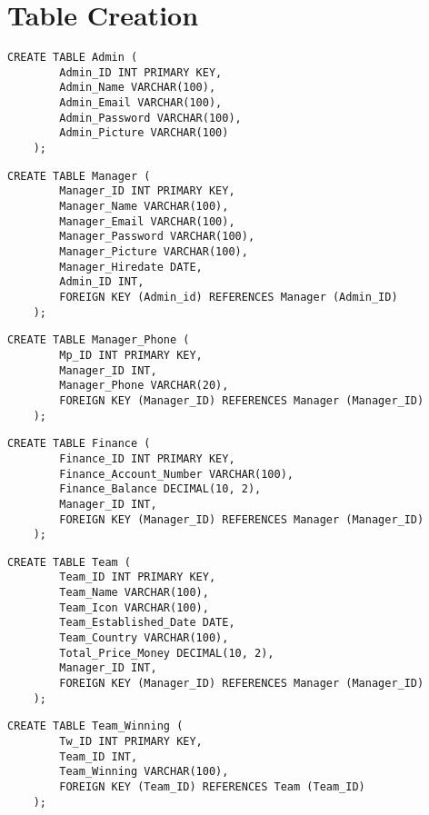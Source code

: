 \section{Table Creation}

\begin{lstlisting}[caption={Create Admin table}, label={lst:create_admin}]
    CREATE TABLE Admin (
        Admin_ID INT PRIMARY KEY,
        Admin_Name VARCHAR(100),
        Admin_Email VARCHAR(100),
        Admin_Password VARCHAR(100),
        Admin_Picture VARCHAR(100)
    );
    \end{lstlisting}
    
    \begin{lstlisting}[caption={Create Manager table}, label={lst:create_manager}]
    CREATE TABLE Manager (
        Manager_ID INT PRIMARY KEY,
        Manager_Name VARCHAR(100),
        Manager_Email VARCHAR(100),
        Manager_Password VARCHAR(100),
        Manager_Picture VARCHAR(100),
        Manager_Hiredate DATE,
        Admin_ID INT,
        FOREIGN KEY (Admin_id) REFERENCES Manager (Admin_ID)
    );
    \end{lstlisting}
    
    \begin{lstlisting}[caption={Create Manager Phone table}, label={lst:create_manager_phone}]
    CREATE TABLE Manager_Phone (
        Mp_ID INT PRIMARY KEY,
        Manager_ID INT,
        Manager_Phone VARCHAR(20),
        FOREIGN KEY (Manager_ID) REFERENCES Manager (Manager_ID)
    );
    \end{lstlisting}
    
    \begin{lstlisting}[caption={Create Finance table}, label={lst:create_finance}]
    CREATE TABLE Finance (
        Finance_ID INT PRIMARY KEY,
        Finance_Account_Number VARCHAR(100),
        Finance_Balance DECIMAL(10, 2),
        Manager_ID INT,
        FOREIGN KEY (Manager_ID) REFERENCES Manager (Manager_ID)
    );
    \end{lstlisting}
 
    \begin{lstlisting}[caption={Create Team table}, label={lst:create_team}]
    CREATE TABLE Team (
        Team_ID INT PRIMARY KEY,
        Team_Name VARCHAR(100),
        Team_Icon VARCHAR(100),
        Team_Established_Date DATE,
        Team_Country VARCHAR(100),
        Total_Price_Money DECIMAL(10, 2),
        Manager_ID INT,
        FOREIGN KEY (Manager_ID) REFERENCES Manager (Manager_ID)
    );
    \end{lstlisting}
    \clearpage   
    \begin{lstlisting}[caption={Create Team Winning table}, label={lst:create_team_winning}]
    CREATE TABLE Team_Winning (
        Tw_ID INT PRIMARY KEY,
        Team_ID INT,
        Team_Winning VARCHAR(100),
        FOREIGN KEY (Team_ID) REFERENCES Team (Team_ID)
    );
    \end{lstlisting}
    
